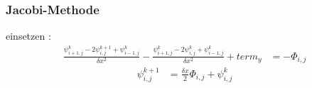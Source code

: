 \begin{frame}
\frametitle{Jacobi-Methode}
einsetzen :
\begin{align}
	\frac{\psi^{k}_{i+1,j} - 2 \psi^{k+1}_{i,j} + \psi^{k}_{i-1,j}}{\delta x^2}
-
	\frac{\psi^{k}_{i+1,j} - 2 \psi^{k  }_{i,j} + \psi^{k}_{i-1,j}}{\delta x^2}
+ \mathit{term_y}
    &=
    -\Phi_{i,j} 	\nonumber
\end{align}
\pause
\begin{align}
	   \psi^{k+1}_{i,j}      
    &=
	\frac{\delta x}{2}\Phi_{i,j} +  \psi^{k}_{i,j}  	\nonumber
\end{align}
\end{frame}
